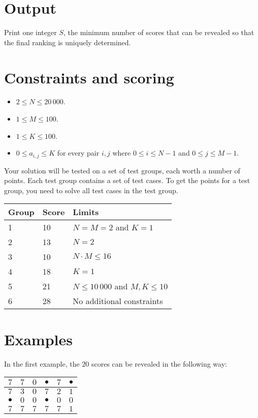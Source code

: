 \section*{Output}
Print one integer $S$, the minimum number of scores that can be revealed so that the final 
ranking is uniquely determined.

\section*{Constraints and scoring}
\begin{itemize}
    \item $2 \leq N \leq 20\,000$.
    \item $1 \leq M \leq 100$.
    \item $1 \leq K \leq 100$.
    \item $0 \leq a_{i,j} \leq K$ for every pair $i,j$ where $0 \leq i \leq N-1$ and $0\leq j \leq M-1$.
\end{itemize}

Your solution will be tested on a set of test groups, each worth a number of points. Each test group contains a set of test cases. To get the points for a test group, you need to solve all test cases in the test group.

\begin{tabular}{|l|l|l|}
    \hline
    Group  &  Score  &  Limits \\
    \hline
     1 & 10 & $N = M = 2$ and $K = 1$ \\
    \hline
     2 & 13 & $N = 2$ \\
    \hline
     3 & 10 & $N \cdot M \leq 16$ \\
    \hline
     4 & 18 & $K = 1$ \\
    \hline
     5 & 21 & $N \leq 10\,000$ and $M,K \leq 10$ \\
    \hline
     6 & 28 & No additional constraints \\
    \hline
\end{tabular}

\section*{Examples}
In the first example, the $20$ scores can be revealed in the following way:

\begin{center}
    \begin{tabular}{|c|c|c|c|c|c|}
    \hline
    $7$ & $7$ & $0$ & $\bullet$ & $7$ & $\bullet$ \\
    \hline
    $7$ & $3$ & $0$ & $7$ & $2$ & $1$ \\
    \hline
    $\bullet$ & $0$ & $0$ & $\bullet$ & $0$ & $0$ \\
    \hline
    $7$ & $7$ & $7$ & $7$ & $7$ & $1$ \\
    \hline
    \end{tabular}
\end{center}

